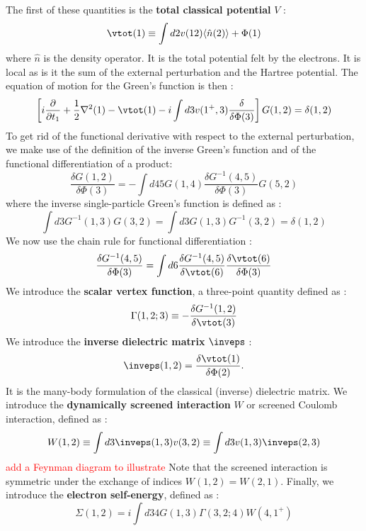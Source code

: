 The first of these quantities is the \textbf{total classical potential} $V$ : 
\begin{equation}
	\vtot (1) \equiv \int d2 v(12) \langle \hat{n}(2) \rangle + \Phi(1) \label{eq:vtot}
\end{equation}
where $\hat{n}$ is the density operator. It is the total potential felt by the electrons. It is local as is it the sum of the external perturbation and the Hartree potential. The equation of motion for the Green's function is then :
\begin{equation}
	\left[ i \frac{\partial}{\partial t_1} + \frac{1}{2}\nabla^2(1) - \vtot (1) -i\int d3 v(1^+,3) \frac{\delta}{\delta \Phi(3)} \right] G(1,2) = \delta(1,2) \label{eq:GF_EOM}
\end{equation}
To get rid of the functional derivative with respect to the external perturbation, we make use of the definition of the inverse Green's function and of the functional differentiation of a product:
\begin{equation}
	\frac{\delta G(1,2)}{\delta \Phi(3)} = - \int d45 G(1,4) \frac{\delta G^{-1}(4,5)}{\delta \Phi(3)} G(5,2)
\end{equation}
where the inverse single-particle Green's function is defined as :
\begin{equation}
	\int d3 G^{-1}(1,3) G(3,2) = \int d3 G(1,3)G^{-1}(3,2) = \delta(1,2) \label{eq:inv_GF}
\end{equation}
We now use the chain rule for functional differentiation :
\begin{equation}
	\frac{\delta G^{-1}(4,5)}{\delta \Phi(3)} = \int d6 \frac{\delta G^{-1}(4,5)}{\delta \vtot(6)} \frac{\delta \vtot(6)}{\delta \Phi(3)}
\end{equation}
We introduce the \textbf{scalar vertex function}, a three-point quantity defined as :
\begin{equation}
	\Gamma(1,2;3) \equiv -\frac{\delta G^{-1}(1,2)}{\delta \vtot(3)} \label{eq:vertex}
\end{equation}
We introduce the \textbf{inverse dielectric matrix} $\inveps$ :
\begin{equation}
	\inveps(1,2) = \frac{\delta \vtot(1)}{\delta \Phi(2)}.
\end{equation} 
It is the many-body formulation of the classical (inverse) dielectric matrix. 
We introduce the \textbf{dynamically screened interaction} $W$ or screened Coulomb interaction, defined as :
\begin{equation}
	W(1,2) \equiv \int d3 \inveps(1,3) v(3,2) \equiv \int d3 v(1,3) \inveps(2,3)
\end{equation}
\textcolor{red}{add a Feynman diagram to illustrate}
Note that the screened interaction is symmetric under the exchange of indices $W(1,2) = W(2,1)$.
Finally, we introduce the \textbf{electron self-energy}, defined as :
\begin{equation}
	\Sigma(1,2) = i \int d34 G(1,3) \Gamma(3,2;4) W(4,1^+)
\end{equation}
%

